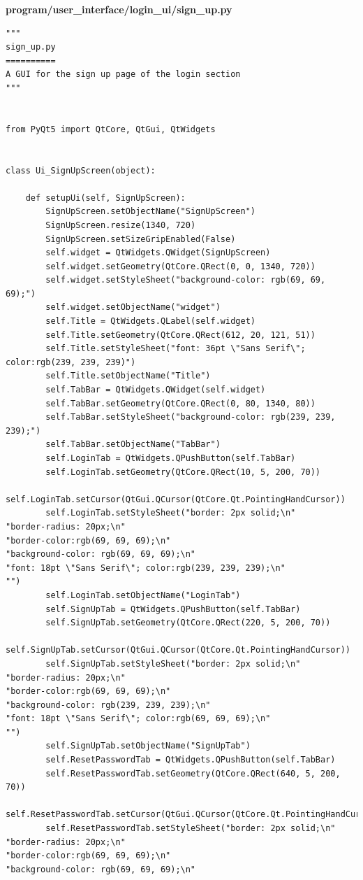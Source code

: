 \documentclass{article}
\begin{document}
\textbf{program/user\_interface/login\_ui/sign\_up.py}
\begin{lstlisting}
"""
sign_up.py
==========
A GUI for the sign up page of the login section
"""


from PyQt5 import QtCore, QtGui, QtWidgets


class Ui_SignUpScreen(object):

    def setupUi(self, SignUpScreen):
        SignUpScreen.setObjectName("SignUpScreen")
        SignUpScreen.resize(1340, 720)
        SignUpScreen.setSizeGripEnabled(False)
        self.widget = QtWidgets.QWidget(SignUpScreen)
        self.widget.setGeometry(QtCore.QRect(0, 0, 1340, 720))
        self.widget.setStyleSheet("background-color: rgb(69, 69, 69);")
        self.widget.setObjectName("widget")
        self.Title = QtWidgets.QLabel(self.widget)
        self.Title.setGeometry(QtCore.QRect(612, 20, 121, 51))
        self.Title.setStyleSheet("font: 36pt \"Sans Serif\"; color:rgb(239, 239, 239)")
        self.Title.setObjectName("Title")
        self.TabBar = QtWidgets.QWidget(self.widget)
        self.TabBar.setGeometry(QtCore.QRect(0, 80, 1340, 80))
        self.TabBar.setStyleSheet("background-color: rgb(239, 239, 239);")
        self.TabBar.setObjectName("TabBar")
        self.LoginTab = QtWidgets.QPushButton(self.TabBar)
        self.LoginTab.setGeometry(QtCore.QRect(10, 5, 200, 70))
        self.LoginTab.setCursor(QtGui.QCursor(QtCore.Qt.PointingHandCursor))
        self.LoginTab.setStyleSheet("border: 2px solid;\n"
"border-radius: 20px;\n"
"border-color:rgb(69, 69, 69);\n"
"background-color: rgb(69, 69, 69);\n"
"font: 18pt \"Sans Serif\"; color:rgb(239, 239, 239);\n"
"")
        self.LoginTab.setObjectName("LoginTab")
        self.SignUpTab = QtWidgets.QPushButton(self.TabBar)
        self.SignUpTab.setGeometry(QtCore.QRect(220, 5, 200, 70))
        self.SignUpTab.setCursor(QtGui.QCursor(QtCore.Qt.PointingHandCursor))
        self.SignUpTab.setStyleSheet("border: 2px solid;\n"
"border-radius: 20px;\n"
"border-color:rgb(69, 69, 69);\n"
"background-color: rgb(239, 239, 239);\n"
"font: 18pt \"Sans Serif\"; color:rgb(69, 69, 69);\n"
"")
        self.SignUpTab.setObjectName("SignUpTab")
        self.ResetPasswordTab = QtWidgets.QPushButton(self.TabBar)
        self.ResetPasswordTab.setGeometry(QtCore.QRect(640, 5, 200, 70))
        self.ResetPasswordTab.setCursor(QtGui.QCursor(QtCore.Qt.PointingHandCursor))
        self.ResetPasswordTab.setStyleSheet("border: 2px solid;\n"
"border-radius: 20px;\n"
"border-color:rgb(69, 69, 69);\n"
"background-color: rgb(69, 69, 69);\n"

\end{lstlisting}
\end{document}
